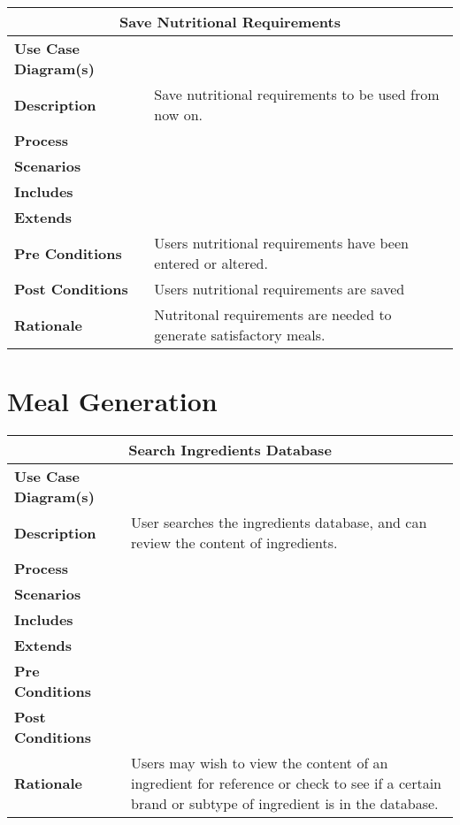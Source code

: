 \documentclass[12pt]{article}
\begin{document}
\begin{center}
\begin{tabularx}{\textwidth}{ |X|X|}
\hline
\multicolumn{2}{|c|}{\textbf{Save Nutritional Requirements}}\\
\hline
\hline
\textbf{Use Case Diagram(s)} & \\ \hline
\textbf{Description} & Save nutritional requirements to be used from now on.\\ \hline
\textbf{Process} & \\ \hline
\textbf{Scenarios} & \\ \hline
\textbf{Includes} & \\ \hline
\textbf{Extends} &  \\ \hline
\textbf{Pre Conditions} & Users  nutritional requirements have been entered or altered.\\ \hline
\textbf{Post Conditions} & Users nutritional requirements are saved\\ \hline
\textbf{Rationale} & Nutritonal requirements are needed to generate satisfactory meals.\\ \hline
\end{tabularx}
\end{center}


\section{Meal Generation} %

\begin{center}
\begin{tabularx}{\textwidth}{ |X|X|}
\hline
\multicolumn{2}{|c|}{\textbf{Search Ingredients Database}}\\
\hline
\hline
\textbf{Use Case Diagram(s)} & \\ \hline
\textbf{Description} & User searches the ingredients database, and can review the content of ingredients.\\ \hline
\textbf{Process} & \\ \hline
\textbf{Scenarios} & \\ \hline
\textbf{Includes} & \\ \hline
\textbf{Extends} &  \\ \hline
\textbf{Pre Conditions} & \\ \hline
\textbf{Post Conditions} & \\ \hline
\textbf{Rationale} & Users may wish to view the content of an ingredient for reference or check to see if a certain brand or subtype of ingredient is in the database.\\ \hline
\end{tabularx}
\end{center}
\end{document}
